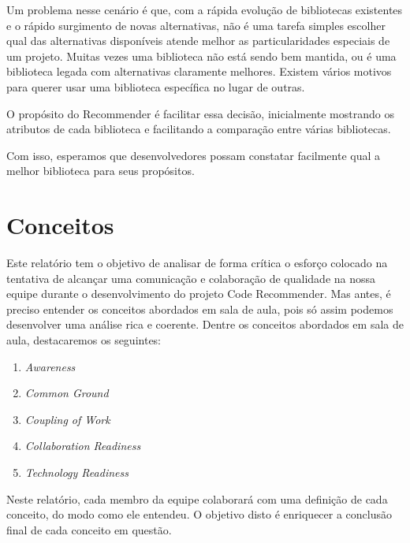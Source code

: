 \documentclass{acm_proc_article-sp}
\begin{document}
Um problema nesse cenário é que, com a rápida evolução de bibliotecas existentes e o rápido surgimento de novas alternativas,
não é uma tarefa simples escolher qual das alternativas disponíveis atende melhor as particularidades especiais de um projeto.
Muitas vezes uma biblioteca não está sendo bem mantida, ou é uma biblioteca legada com alternativas claramente melhores. Existem
vários motivos para querer usar uma biblioteca específica no lugar de outras.

O propósito do Recommender é facilitar essa decisão, inicialmente mostrando os atributos de cada biblioteca e facilitando a comparação entre várias bibliotecas.

Com isso, esperamos que desenvolvedores possam constatar facilmente qual a melhor
biblioteca para seus propósitos.


\section{Conceitos}

Este relatório tem o objetivo de analisar de forma crítica o esforço colocado na tentativa de alcançar uma comunicação e colaboração de qualidade na nossa equipe durante o desenvolvimento do projeto Code Recommender. Mas antes, é preciso entender os conceitos abordados em sala de aula, pois só assim podemos desenvolver uma análise rica e coerente.
Dentre os conceitos abordados em sala de aula, destacaremos os seguintes:
\begin{enumerate}
\item \textsl{Awareness}
\item \textsl{Common Ground}
\item \textsl{Coupling of Work}
\item \textsl{Collaboration Readiness}
\item \textsl{Technology Readiness}
\end{enumerate}
Neste relatório, cada membro da equipe colaborará com uma definição de cada conceito, do modo como ele entendeu. O objetivo disto é enriquecer a conclusão final de cada conceito em questão.
\end{document}
